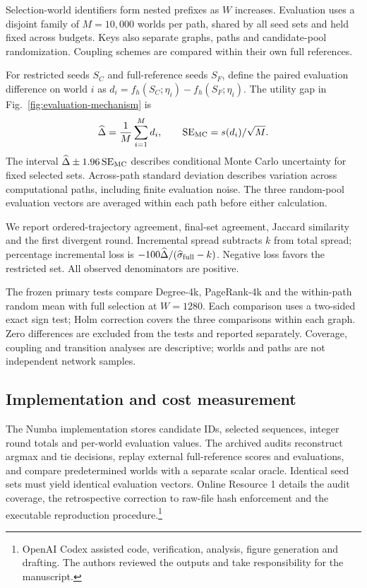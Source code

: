 \documentclass[smallextended]{svjour3}
\begin{document}
Selection-world identifiers form nested prefixes as $W$ increases. Evaluation uses a disjoint family of $M=10,000$ worlds per path, shared by all seed sets and held fixed across budgets. Keys also separate graphs, paths and candidate-pool randomization. Coupling schemes are compared within their own full references.

For restricted seeds $S_C$ and full-reference seeds $S_F$, define the paired evaluation difference on world $i$ as $d_i=f_h(S_C;\eta_i)-f_h(S_F;\eta_i)$. The utility gap in Fig.~\ref{fig:evaluation-mechanism} is
\begin{equation}
\widehat\Delta=\frac{1}{M}\sum_{i=1}^{M}d_i,
\qquad \operatorname{SE}_{\rm MC}=s(d_i)/\sqrt M.
\end{equation}
The interval $\widehat\Delta\pm1.96\operatorname{SE}_{\rm MC}$ describes conditional Monte Carlo uncertainty for fixed selected sets. Across-path standard deviation describes variation across computational paths, including finite evaluation noise. The three random-pool evaluation vectors are averaged within each path before either calculation.

We report ordered-trajectory agreement, final-set agreement, Jaccard similarity and the first divergent round. Incremental spread subtracts $k$ from total spread; percentage incremental loss is $-100\widehat\Delta/(\widehat\sigma_{\rm full}-k)$. Negative loss favors the restricted set. All observed denominators are positive.

The frozen primary tests compare Degree-4k, PageRank-4k and the within-path random mean with full selection at $W=1280$. Each comparison uses a two-sided exact sign test; Holm correction covers the three comparisons within each graph. Zero differences are excluded from the tests and reported separately. Coverage, coupling and transition analyses are descriptive; worlds and paths are not independent network samples.

\subsection{Implementation and cost measurement}
The Numba implementation stores candidate IDs, selected sequences, integer round totals and per-world evaluation values. The archived audits reconstruct argmax and tie decisions, replay external full-reference scores and evaluations, and compare predetermined worlds with a separate scalar oracle. Identical seed sets must yield identical evaluation vectors. Online Resource 1 details the audit coverage, the retrospective correction to raw-file hash enforcement and the executable reproduction procedure.\footnote{OpenAI Codex assisted code, verification, analysis, figure generation and drafting. The authors reviewed the outputs and take responsibility for the manuscript.}
\end{document}
